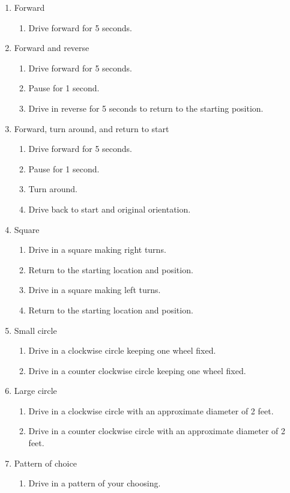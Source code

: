 \documentclass{handout}
\begin{document}
	\begin{enumerate}
		\item Forward
		\begin{enumerate}
			\item Drive forward for 5 seconds.
		\end{enumerate}
		\item Forward and reverse
		\begin{enumerate}
			\item Drive forward for 5 seconds.
			\item Pause for 1 second.
			\item Drive in reverse for 5 seconds to return to the starting position.
		\end{enumerate}
		\item Forward, turn around, and return to start
		\begin{enumerate}
			\item Drive forward for 5 seconds.
			\item Pause for 1 second.
			\item Turn around.
			\item Drive back to start and original orientation.
		\end{enumerate}
		\item Square
		\begin{enumerate}
			\item Drive in a square making right turns.
			\item Return to the starting location and position.
			\item Drive in a square making left turns.
			\item Return to the starting location and position.
		\end{enumerate}
		\item Small circle
		\begin{enumerate}
			\item Drive in a clockwise circle keeping one wheel fixed.
			\item Drive in a counter clockwise circle keeping one wheel fixed.
		\end{enumerate}
		\item Large circle
		\begin{enumerate}
			\item Drive in a clockwise circle with an approximate diameter of 2 feet.
			\item Drive in a counter clockwise circle with an approximate diameter of 2 feet.
		\end{enumerate}
		\item Pattern of choice
		\begin{enumerate}
			\item Drive in a pattern of your choosing.
		\end{enumerate} 
	

\end{enumerate}


	
\end{document}
